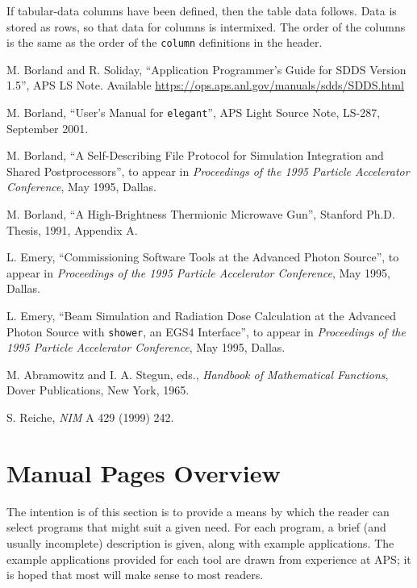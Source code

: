 \documentclass[11pt]{article}
\begin{document}
If tabular-data columns have been defined, then the table data follows.
Data is stored as rows, so that data for columns is intermixed.  The
order of the columns is the same as the order of the {\tt column} definitions
in the header.

\begin{thebibliography}{9}

    M. Borland and R. Soliday, ``Application Programmer's Guide for SDDS Version
1.5'', APS LS Note. Available \href{https://ops.aps.anl.gov/manuals/sdds/SDDS.html}{https://ops.aps.anl.gov/manuals/sdds/SDDS.html}

        M. Borland, ``User's Manual for {\tt elegant}'', 
        APS Light Source Note, LS-287, September 2001.

        M. Borland, ``A Self-Describing File Protocol for Simulation Integration and Shared Postprocessors'',
        to appear in {\em Proceedings of the 1995 Particle Accelerator Conference}, May 1995, Dallas.

        M. Borland, ``A High-Brightness Thermionic Microwave Gun'', Stanford Ph.D. Thesis, 1991, Appendix A.

        L. Emery, ``Commissioning Software Tools at the Advanced Photon Source'', 
        to appear in {\em Proceedings of the 1995 Particle Accelerator Conference}, May 1995, Dallas.

        L. Emery, ``Beam Simulation and Radiation Dose Calculation at the Advanced Photon Source with
        {\tt shower}, an EGS4 Interface'',
         to appear in {\em Proceedings of the 1995 Particle Accelerator Conference}, May 1995, Dallas.

        M. Abramowitz and I. A. Stegun, eds., {\em Handbook of Mathematical Functions}, Dover Publications,
        New York, 1965.

 S. Reiche, {\em NIM} A 429 (1999) 242.

\end{thebibliography}

\newpage
\section{Manual Pages Overview}

\label{ManualPagesOverview}

The intention is of this section is to provide a means by which the
reader can select programs that might suit a given need.  For each
program, a brief (and usually incomplete) description is given, along
with example applications.  The example applications provided for each
tool are drawn from experience at APS; it is hoped that most will make
sense to most readers.
\end{document}
